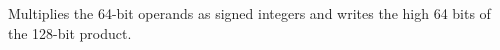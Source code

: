Multiplies the 64-bit operands as signed integers and writes the high 64 bits of the 128-bit product.
